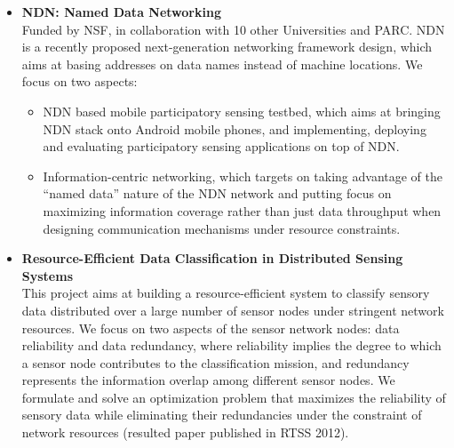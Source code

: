 \begin{itemize}
\item \textbf{NDN: Named Data Networking} \\ Funded by NSF, in
  collaboration with 10 other Universities and PARC. NDN is a recently
  proposed next-generation networking framework design, which aims at
  basing addresses on data names instead of machine locations. We
  focus on two aspects:
\begin{itemize}
\item NDN based mobile participatory sensing testbed, which aims at
  bringing NDN stack onto Android mobile phones, and implementing,
  deploying and evaluating participatory sensing applications on top
  of NDN.
\item Information-centric networking, which targets on taking
  advantage of the ``named data'' nature of the NDN network and
  putting focus on maximizing information coverage rather than just
  data throughput when designing communication mechanisms under
  resource constraints.
\end{itemize}

\item \textbf{Resource-Efficient Data Classification in Distributed
  Sensing Systems} \\ This project aims at building a
  resource-efficient system to classify sensory data distributed over
  a large number of sensor nodes under stringent network resources.
  We focus on two aspects of the sensor network nodes: data
  reliability and data redundancy, where reliability implies the
  degree to which a sensor node contributes to the classification
  mission, and redundancy represents the information overlap among
  different sensor nodes. We formulate and solve an optimization
  problem that maximizes the reliability of sensory data while
  eliminating their redundancies under the constraint of network
  resources (resulted paper published in \textsc{RTSS 2012}).

\end{itemize}

